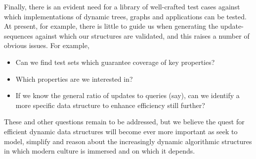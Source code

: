 \documentclass{elsarticle}
\begin{document}
Finally, there is an evident need for a library of well-crafted test cases against which implementations of dynamic trees, graphs and applications can be tested. At present, for example, there is little to guide us when generating the update-sequences against which our structures are validated, and this raises a number of obvious issues. For example,

\begin{itemize}
\item Can we find test sets which guarantee coverage of key properties?
\item Which properties are we interested in?
\item If we know the general ratio of updates to queries (say), can we identify a more specific data structure to enhance efficiency still further?
\end{itemize}

These and other questions remain to be addressed, but we believe the quest for efficient dynamic data structures will become ever more important as seek to model, simplify and reason about the increasingly dynamic algorithmic structures in which modern culture is immersed and on which it depends.




\end{document}
